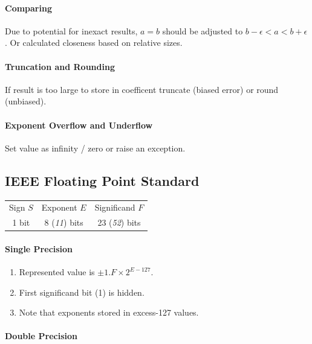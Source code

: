 \documentclass[twocolumn,english]{article}
\providecommand{\tabularnewline}{\\}
\begin{document}
\paragraph{Comparing}

Due to potential for inexact results, $a=b$ should be adjusted to
$b-\epsilon<a<b+\epsilon$. Or calculated closeness based on relative
sizes.


\paragraph{Truncation and Rounding}

If result is too large to store in coefficent truncate (biased error)
or round (unbiased).


\paragraph{Exponent Overflow and Underflow}

Set value as infinity / zero or raise an exception.


\subsection{IEEE Floating Point Standard}

\noindent \begin{center}
\begin{tabular}{ccc}
\toprule 
Sign $S$ & Exponent $E$ & Significand $F$\tabularnewline
1 bit & 8 (\emph{11}) bits & 23 (\emph{52}) bits\tabularnewline
\bottomrule
\end{tabular}
\par\end{center}


\paragraph{Single Precision}
\begin{enumerate}
\item Represented value is $\pm1.F\times2^{E-127}$.
\item First significand bit (1) is hidden.
\item Note that exponents stored in excess-127 values.
\end{enumerate}

\paragraph{Double Precision}
\end{document}
